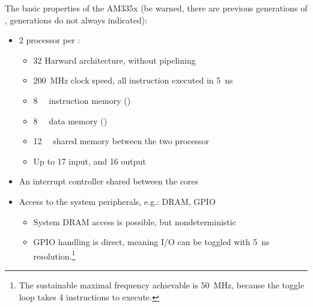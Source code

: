 The basic properties of the AM335x \pruss{} (be warned, there are previous generations of \pruss, generations do not always indicated):
\begin{itemize}
	\item 2 \pru{} processor per \pruss{}:
	\begin{itemize}
		\item \qty{32}{\bit} Harward architecture, without pipelining
		\item \qty{200}{\mega\hertz} clock speed, all instruction executed in \qty{5}{\nano\second}
		\item \qty{8}{\kilo\byte} instruction memory (\iram)
		\item \qty{8}{\kilo\byte} data memory (\dram)
		\item \qty{12}{\kilo\byte} shared memory between the two processor
		\item Up to 17 input, and 16 output
	\end{itemize}
	\item An interrupt controller shared between the \pru{} cores
	\item Access to the system peripherals, e.g.: DRAM, GPIO
	\begin{itemize}
		\item System DRAM access is possible, but nondeterministic
		\item GPIO handling is direct, meaning I/O can be toggled with \qty{5}{\nano\second} resolution.\footnote{The sustainable maximal frequency achievable is \qty{50}{\mega\hertz}, because the toggle loop takes 4 instructions to execute.}
	\end{itemize}
\end{itemize}

